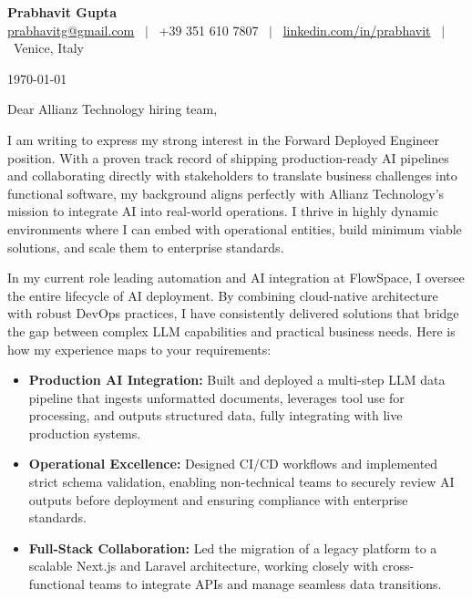 \documentclass[11pt,a4paper]{article}
\begin{document}
\begin{center}
    {\huge \textbf{\textcolor{accent}{Prabhavit Gupta}}} \\[0.5em]
    \href{mailto:prabhavitg@gmail.com}{prabhavitg@gmail.com} \ $|$ \ +39 351 610 7807 \ $|$ \ \href{https://www.linkedin.com/in/prabhavit/}{linkedin.com/in/prabhavit} \ $|$ \ Venice, Italy
\end{center}

\vspace{2em}

\today

\vspace{1.5em}
Dear Allianz Technology hiring team,

I am writing to express my strong interest in the Forward Deployed Engineer position. With a proven track record of shipping production-ready AI pipelines and collaborating directly with stakeholders to translate business challenges into functional software, my background aligns perfectly with Allianz Technology's mission to integrate AI into real-world operations. I thrive in highly dynamic environments where I can embed with operational entities, build minimum viable solutions, and scale them to enterprise standards.

In my current role leading automation and AI integration at FlowSpace, I oversee the entire lifecycle of AI deployment. By combining cloud-native architecture with robust DevOps practices, I have consistently delivered solutions that bridge the gap between complex LLM capabilities and practical business needs. Here is how my experience maps to your requirements:

\begin{itemize}
    \item \textbf{Production AI Integration:} Built and deployed a multi-step LLM data pipeline that ingests unformatted documents, leverages tool use for processing, and outputs structured data, fully integrating with live production systems.
    \item \textbf{Operational Excellence:} Designed CI/CD workflows and implemented strict schema validation, enabling non-technical teams to securely review AI outputs before deployment and ensuring compliance with enterprise standards.
    \item \textbf{Full-Stack Collaboration:} Led the migration of a legacy platform to a scalable Next.js and Laravel architecture, working closely with cross-functional teams to integrate APIs and manage seamless data transitions.
\end{itemize}
\end{document}
